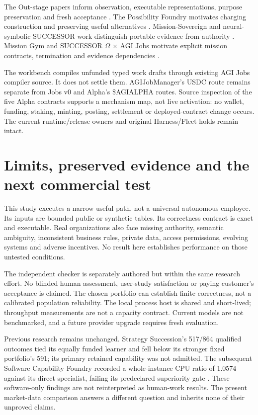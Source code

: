 \documentclass[11pt,a4paper]{article}
\begin{document}
The Out-stage papers inform observation, executable representations, purpose preservation and fresh acceptance \citep{out_learn,out_think,out_design,out_strategise,out_execute,out_evolve}. The Possibility Foundry motivates charging construction and preserving useful alternatives \citep{possibility_foundry}. Mission-Sovereign and neural-symbolic SUCCESSOR work distinguish portable evidence from authority \citep{mission_sovereign,neural_symbolic}. Mission Gym and SUCCESSOR $\Omega$ $\times$ AGI Jobs motivate explicit mission contracts, termination and evidence dependencies \citep{mission_gym,successor_jobs}.

The workbench compiles unfunded typed work drafts through existing AGI Jobs compiler source. It does not settle them. AGIJobManager's USDC route remains separate from Jobs v0 and Alpha's \$AGIALPHA routes. Source inspection of the five Alpha contracts supports a mechanism map, not live activation: no wallet, funding, staking, minting, posting, settlement or deployed-contract change occurs. The current runtime/release owners and original Harness/Fleet holds remain intact.

\section{Limits, preserved evidence and the next commercial test}

This study executes a narrow useful path, not a universal autonomous employee. Its inputs are bounded public or synthetic tables. Its correctness contract is exact and executable. Real organizations also face missing authority, semantic ambiguity, inconsistent business rules, private data, access permissions, evolving systems and adverse incentives. No result here establishes performance on those untested conditions.

The independent checker is separately authored but within the same research effort. No blinded human assessment, user-study satisfaction or paying customer's acceptance is claimed. The chosen portfolio can establish finite correctness, not a calibrated population reliability. The local process host is shared and short-lived; throughput measurements are not a capacity contract. Current models are not benchmarked, and a future provider upgrade requires fresh evaluation.

Previous research remains unchanged. Strategy Succession's 517/864 qualified outcomes tied its equally funded learner and fell below its stronger fixed portfolio's 591; its primary retained capability was not admitted. The subsequent Software Capability Foundry recorded a whole-instance CPU ratio of 1.0574 against its direct specialist, failing its predeclared superiority gate \citep{strategy_succession,software_foundry}. These software-only findings are not reinterpreted as human-work results. The present market-data comparison answers a different question and inherits none of their unproved claims.
\end{document}
